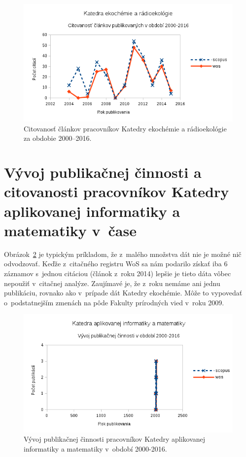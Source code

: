 \begin{figure}
  \centering
  \includegraphics[width=\textwidth]{obr/plot-eco-citations.png}
  \caption{Citovanosť článkov pracovníkov Katedry ekochémie a rádioekológie za obdobie 2000--2016.}
  \label{fig:plot.eco.citations}
\end{figure}


\section{Vývoj publikačnej činnosti a citovanosti pracovníkov Katedry aplikovanej informatiky a matematiky v~čase}

Obrázok~\ref{fig:plot.inf.publications} je typickým príkladom, že z~malého
množstva dát nie je možné nič odvodzovať.  Keďže z~citačného registru WoS sa nám
podarilo získať iba 6 záznamov s~jednou citáciou (článok z~roku 2014) lepšie je
tieto dáta vôbec nepoužiť v~citačnej analýze.  Zaujímavé je, že z~roku nemáme
ani jednu publikáciu, rovnako ako v~prípade dát Katedry ekochémie.  Môže to
vypovedať o~podstatnejším zmenách na pôde Fakulty prírodných vied v~roku 2009.

\begin{figure}
  \centering
  \includegraphics[width=\textwidth]{obr/plot-inf-publications.png}
  \caption{Vývoj publikačnej činnosti pracovníkov Katedry aplikovanej
    informatiky a matematiky v~období 2000-2016.}
  \label{fig:plot.inf.publications}
\end{figure}

